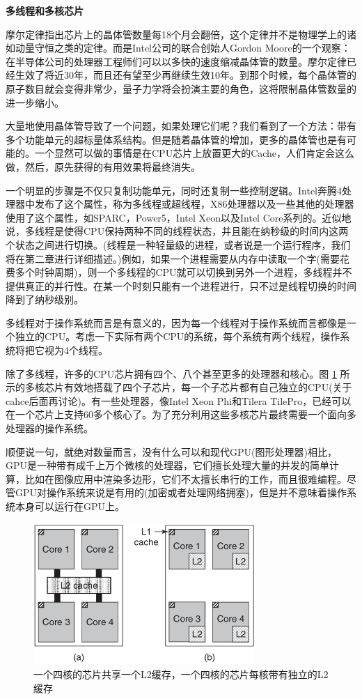	\textbf{多线程和多核芯片}
	
	摩尔定律指出芯片上的晶体管数量每18个月会翻倍，这个定律并不是物理学上的诸如动量守恒之类的定律。而是Intel公司的联合创始人Gordon Moore的一个观察：在半导体公司的处理器工程师们可以以多快的速度缩减晶体管的数量。摩尔定律已经生效了将近30年，而且还有望至少再继续生效10年。到那个时候，每个晶体管的原子数目就会变得非常少，量子力学将会扮演主要的角色，这将限制晶体管数量的进一步缩小。
	
	大量地使用晶体管导致了一个问题，如果处理它们呢？我们看到了一个方法：带有多个功能单元的超标量体系结构。但是随着晶体管的增加，更多的晶体管也是有可能的。一个显然可以做的事情是在CPU芯片上放置更大的Cache，人们肯定会这么做，然后，原先获得的有用效果将最终消失。
	
	一个明显的步骤是不仅只复制功能单元，同时还复制一些控制逻辑。Intel奔腾4处理器中发布了这个属性，称为多线程或超线程，X86处理器以及一些其他的处理器使用了这个属性，如SPARC，Power5，Intel Xeon以及Intel Core系列的。近似地说，多线程是使得CPU保持两种不同的线程状态，并且能在纳秒级的时间内这两个状态之间进行切换。(线程是一种轻量级的进程，或者说是一个运行程序，我们将在第二章进行详细描述。)例如，如果一个进程需要从内存中读取一个字(需要花费多个时钟周期)，则一个多线程的CPU就可以切换到另外一个进程，多线程并不提供真正的并行性。在某一个时刻只能有一个进程进行，只不过是线程切换的时间降到了纳秒级别。
	
	多线程对于操作系统而言是有意义的，因为每一个线程对于操作系统而言都像是一个独立的CPU。考虑一下实际有两个CPU的系统，每个系统有两个线程，操作系统将把它视为4个线程。
	
	除了多线程，许多的CPU芯片拥有四个、八个甚至更多的处理器和核心。图 \ref{fig:quadcores} 所示的多核芯片有效地搭载了四个子芯片，每一个子芯片都有自己独立的CPU(关于cahce后面再讨论)。有一些处理器，像Intel Xeon Phi和Tilera TilePro，已经可以在一个芯片上支持60多个核心了。为了充分利用这些多核芯片最终需要一个面向多处理器的操作系统。
	
	顺便说一句，就绝对数量而言，没有什么可以和现代GPU(图形处理器)相比，GPU是一种带有成千上万个微核的处理器，它们擅长处理大量的并发的简单计算，比如在图像应用中渲染多边形，它们不太擅长串行的工作，而且很难编程。尽管GPU对操作系统来说是有用的(加密或者处理网络拥塞)，但是并不意味着操作系统本身可以运行在GPU上。
	
	\begin{figure}[ht]\small
		\centering
		\includegraphics[width=0.75\textwidth]{FIG/1-8.png}
		\caption{一个四核的芯片共享一个L2缓存，一个四核的芯片每核带有独立的L2缓存}\label{fig:quadcores}
	\end{figure}
	
